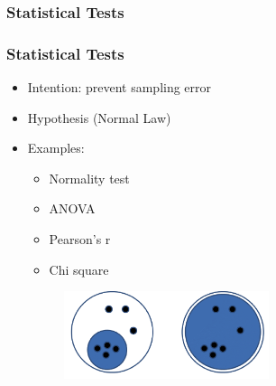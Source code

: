 \subsubsection{Statistical Tests}

\begin{frame}\frametitle{Statistical Tests}
   \begin{itemize}
      \item Intention: prevent sampling error
      \item Hypothesis (Normal Law)
      \item Examples:
      \begin{itemize}
         \item Normality test
         \item ANOVA
         \item Pearson's r
         \item Chi square
      \end{itemize}
      \vspace{.5cm}
      \begin{figure}[H]
         \includegraphics[width=6cm]{../images/illustrations/stat_sample.png}
      \end{figure}
   \end{itemize}
\end{frame}



